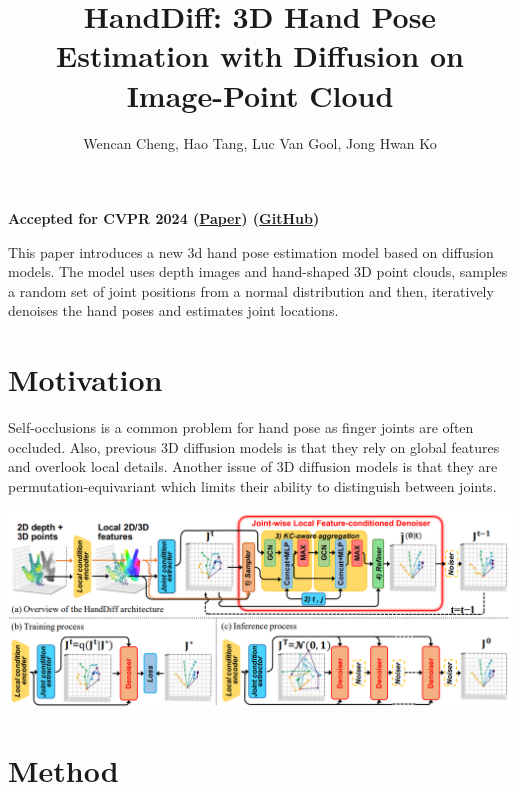 \documentclass{article}
\title{HandDiff: 3D Hand Pose Estimation with Diffusion on Image-Point Cloud}
\author{Wencan Cheng, Hao Tang, Luc Van Gool, Jong Hwan Ko}
\date{}
\begin{document}
\maketitle

\begin{center}\textbf{Accepted for CVPR 2024 (\href{https://arxiv.org/pdf/2404.03159}{Paper}) (\href{https://github.com/cwc1260/HandDiff}{GitHub})}\end{center}

This paper introduces a new 3d hand pose estimation model based on diffusion models. The model uses depth images and hand-shaped 3D point clouds, samples a random set of joint positions from a normal distribution and then, iteratively denoises the hand poses and estimates joint locations.

\section*{Motivation}

Self-occlusions is a common problem for hand pose as finger joints are often occluded. Also, previous 3D diffusion models is that they rely on global features and overlook local details. Another issue of 3D diffusion models is that they are permutation-equivariant which limits their ability to distinguish between joints.

\begin{center}
    \includegraphics[scale=0.4]{handdiff-1.png}
\end{center}

\section*{Method}
\end{document}
